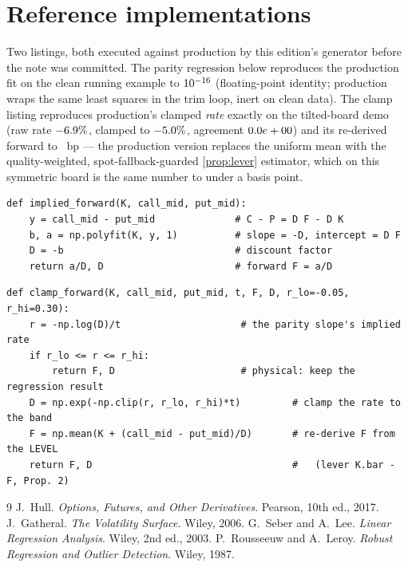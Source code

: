 \documentclass[11pt]{article}
\begin{document}
\section{Reference implementations}
\label{app:ref}

Two listings, both executed against production by this edition's
generator before the note was committed.  The parity regression below
reproduces the production fit on the clean running example to
$10^{-16}$ (floating-point identity; production wraps the
same least squares in the trim loop, inert on clean data).  The clamp
listing reproduces production's clamped \emph{rate} exactly on the
tilted-board demo (raw rate $-6.9\%$, clamped to
$-5.0\%$, agreement $0.0e+00$) and its re-derived
forward to \fwdinfrefclfbp\ bp --- the production version replaces the
uniform mean with the quality-weighted, spot-fallback-guarded
\cref{prop:lever} estimator, which on this symmetric board is the same
number to under a basis point.

\begin{lstlisting}[caption={Put--call parity regression for the forward and
discount --- distilled from \texttt{data/forwards.py} (production uses
\texttt{lstsq} inside the outlier-trim loop and takes the snapshot, not
raw arrays).},label={lst:parity}]
def implied_forward(K, call_mid, put_mid):
    y = call_mid - put_mid              # C - P = D F - D K
    b, a = np.polyfit(K, y, 1)          # slope = -D, intercept = D F
    D = -b                              # discount factor
    return a/D, D                       # forward F = a/D
\end{lstlisting}

\begin{lstlisting}[caption={The discount clamp and level re-derivation ---
simplified from \texttt{data/forwards.py}, where the level mean is the
quality-weighted \texttt{\_forward\_at\_discount} (inverse spread
$\times$ ATM kernel) with the spot fallback of \cref{sec:clamp}.}]
def clamp_forward(K, call_mid, put_mid, t, F, D, r_lo=-0.05, r_hi=0.30):
    r = -np.log(D)/t                     # the parity slope's implied rate
    if r_lo <= r <= r_hi:
        return F, D                      # physical: keep the regression result
    D = np.exp(-np.clip(r, r_lo, r_hi)*t)         # clamp the rate to the band
    F = np.mean(K + (call_mid - put_mid)/D)       # re-derive F from the LEVEL
    return F, D                                   #   (lever K.bar - F, Prop. 2)
\end{lstlisting}

\begin{thebibliography}{9}
 J.~Hull.  \emph{Options, Futures, and Other
Derivatives}.  Pearson, 10th ed., 2017.
 J.~Gatheral.  \emph{The Volatility Surface}.
Wiley, 2006.
 G.~Seber and A.~Lee.  \emph{Linear Regression
Analysis}.  Wiley, 2nd ed., 2003.
 P.~Rousseeuw and A.~Leroy.  \emph{Robust
Regression and Outlier Detection}.  Wiley, 1987.
\end{thebibliography}
\end{document}

